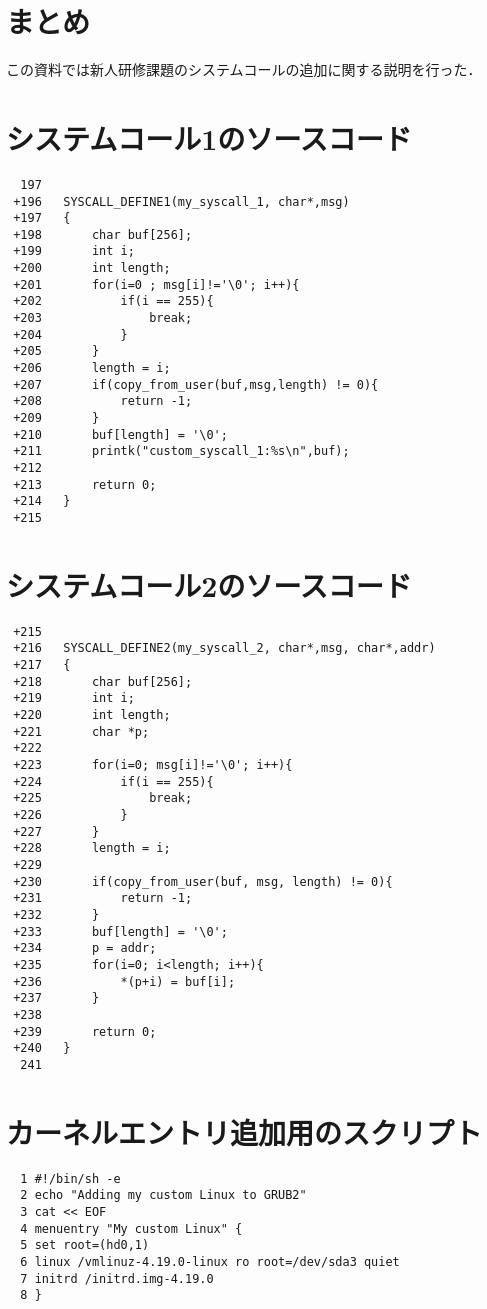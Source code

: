 \documentclass[12pt]{jsarticle}
\begin{document}
\section{まとめ}
\label{sec:conclusion}
この資料では新人研修課題のシステムコールの追加に関する説明を行った．


\appendix
\section{システムコール1のソースコード}
\label{sec:A}
\begin{verbatim}
  197
 +196	SYSCALL_DEFINE1(my_syscall_1, char*,msg)
 +197	{
 +198		char buf[256];
 +199		int i;
 +200		int length;
 +201		for(i=0 ; msg[i]!='\0'; i++){
 +202			if(i == 255){
 +203				break;
 +204			}
 +205		}
 +206		length = i;
 +207		if(copy_from_user(buf,msg,length) != 0){
 +208			return -1;
 +209		}
 +210		buf[length] = '\0';
 +211		printk("custom_syscall_1:%s\n",buf);
 +212	
 +213		return 0;
 +214	}
 +215
\end{verbatim}

\section{システムコール2のソースコード}
\label{sec:B}
\begin{verbatim}
 +215
 +216	SYSCALL_DEFINE2(my_syscall_2, char*,msg, char*,addr)
 +217	{
 +218		char buf[256];
 +219		int i; 
 +220		int length;
 +221		char *p;
 +222	
 +223		for(i=0; msg[i]!='\0'; i++){
 +224			if(i == 255){
 +225				break;
 +226			}
 +227		}
 +228		length = i;
 +229	
 +230		if(copy_from_user(buf, msg, length) != 0){
 +231			return -1;
 +232		}
 +233		buf[length] = '\0';
 +234		p = addr;
 +235		for(i=0; i<length; i++){
 +236			*(p+i) = buf[i];	
 +237		}
 +238	
 +239		return 0;
 +240	}
  241
\end{verbatim}

\section{カーネルエントリ追加用のスクリプト}
\label{sec:C}
  \begin{verbatim}
  1 #!/bin/sh -e
  2 echo "Adding my custom Linux to GRUB2"
  3 cat << EOF
  4 menuentry "My custom Linux" {
  5 set root=(hd0,1)
  6 linux /vmlinuz-4.19.0-linux ro root=/dev/sda3 quiet
  7 initrd /initrd.img-4.19.0
  8 } 
\end{verbatim}
\end{document}
